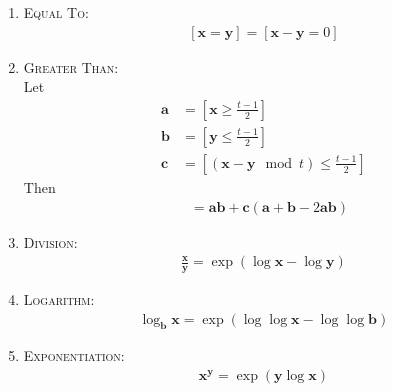 \documentclass{article}
\begin{document}
        \begin{enumerate}[-]
            \item
                \textsc{Equal To}:
                \begin{align}
                    \left[\mathbf{x} = \mathbf{y}\right]
                    =
                    \left[\mathbf{x} - \mathbf{y} = 0\right]
                \end{align}
            \item
                \textsc{Greater Than}:
                \\
                Let
                \begin{align}
                    \mathbf{a} 
                    &= \left[\mathbf{x}\geq \frac{t-1}{2}\right]
                    \\
                    \mathbf{b} 
                    &= \left[\mathbf{y} \leq \frac{t-1}{2}\right]
                    \\
                    \mathbf{c} &= \left[(\mathbf{x} - \mathbf{y} \mod{t}) \leq \frac{t-1}{2}\right]
                \end{align}
                Then
                \begin{align}
                    [\mathbf{x} \geq \mathbf{y}] 
                    &=
                    \mathbf{a}\mathbf{b} + \mathbf{c}(\mathbf{a} + \mathbf{b} - 2\mathbf{a}\mathbf{b})
                \end{align}
            \item
                \textsc{Division}:
                \begin{align}
                    \frac{\mathbf{x}}{\mathbf{y}} = \exp(\log\mathbf{x} - \log\mathbf{y})
                \end{align}
            \item
                \textsc{Logarithm}:
                \begin{align}
                    \log_{\mathbf{b}}\mathbf{x} = \exp(\log\log\mathbf{x} - \log\log\mathbf{b})
                \end{align}
            \item
                \textsc{Exponentiation}:
                \begin{align}
                    \mathbf{x}^\mathbf{y} = \exp(\mathbf{y}\log\mathbf{x})
                \end{align}
        \end{enumerate}
\end{document}
